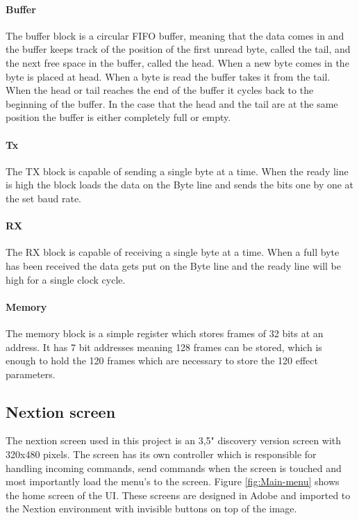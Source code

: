 \paragraph{Buffer}
The buffer block is a circular FIFO buffer, meaning that the data comes in and the buffer keeps track of the position of the first unread byte, called the tail, and the next free space in the buffer, called the head. When a new byte comes in the byte is placed at head. When a byte is read the buffer takes it from the tail. When the head or tail reaches the end of the buffer it cycles back to the beginning of the buffer. In the case that the head and the tail are at the same position the buffer is either completely full or empty.

\paragraph{Tx}
The TX block is capable of sending a single byte at a time. When the ready line is high the block loads the data on the Byte line and sends the bits one by one at the set baud rate.

\paragraph{RX}
The RX block is capable of receiving a single byte at a time. When a full byte has been received the data gets put on the Byte line and the ready line will be high for a single clock cycle.

\paragraph{Memory}
The memory block is a simple register which stores frames of 32 bits at an address. It has 7 bit addresses meaning 128 frames can be stored, which is enough to hold the 120 frames which are necessary to store the 120 effect parameters.

\subsection{Nextion screen}
The nextion screen used in this project is an 3,5" discovery version screen with 320x480 pixels. The screen has its own controller which is responsible for handling incoming commands, send commands when the screen is touched and most importantly load the menu's to the screen. Figure \ref{fig:Main-menu} shows the home screen of the UI. These screens are designed in Adobe and imported to the Nextion environment with invisible buttons on top of the image.

